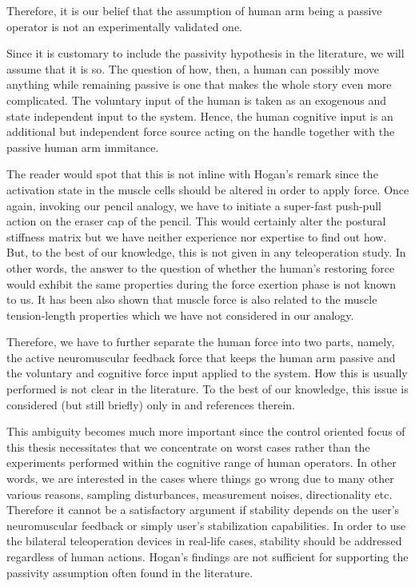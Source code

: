 Therefore, it is our belief that the assumption of human arm being a passive operator is not an experimentally validated one. 
 


Since it is customary to include the passivity hypothesis in the literature, we will assume that it is so. The question of how, 
then, a human can possibly move anything while remaining passive is one that makes the whole 
story even more complicated. The voluntary input of the human is taken as an exogenous and state independent input to the system. 
Hence, the human cognitive input is an additional but independent force source acting on the handle together with the passive 
human arm immitance.


The reader would spot that this is not inline with Hogan's remark since the activation state in the muscle cells should be altered in 
order to apply force. Once again, invoking our pencil analogy, we have to initiate a super-fast push-pull action on the eraser cap 
of the pencil. This would certainly alter the postural stiffness matrix but we have neither experience nor expertise to find out how. 
But, to the best of our knowledge, this is not given in any teleoperation study. In other words, the answer to the question of whether 
the human's restoring force would exhibit the same properties during the force exertion phase is not known to us. It has been also shown 
that muscle force is also related to the muscle tension-length properties \cite{eltit} which we have not considered in our analogy.

Therefore, we have to further separate the human force into two parts, namely, the active neuromuscular feedback force that keeps the 
human arm passive and the voluntary and cognitive force input applied to the system. How this is usually performed is not clear in the 
literature. To the best of our knowledge, this issue is considered (but still briefly) only in \cite[Sec. II.B]{kazeroonitsay} and 
references therein.


This ambiguity becomes much more important since the control oriented focus of this thesis necessitates that we concentrate on
worst cases rather than the experiments performed within the cognitive range of human operators. In other words, we are interested in
the cases where things go wrong due to many other various reasons, sampling disturbances, measurement noises, directionality etc. Therefore
it cannot be a satisfactory argument if stability depends on the user's neuromuscular feedback or simply user's stabilization capabilities. 
In order to use the bilateral teleoperation devices in real-life cases, stability should be addressed regardless of human actions. Hogan's 
findings are not sufficient for supporting the passivity assumption often found in the literature. 


